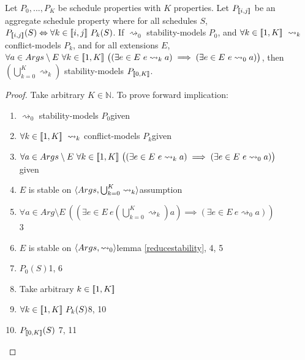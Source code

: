 \begin{theorem}
	\label{modelling}
	Let $P_0,...,P_K$ be schedule properties with $K$ properties. Let $P_{[\![{i,j}]\!]}$ be an aggregate schedule property where for all schedules $S$, $P_{[\![{i, j}]\!]}(S)\Leftrightarrow\forall k\in[\![{i,j}]\!]\ P_k(S)$.
	\linespace
	If $\rightsquigarrow_0$ stability-models $P_0$, and $\forall k\in\intset{1,K}\ \rightsquigarrow_k$ conflict-models $P_k$, and for all extensions $E$, $\forall a\in Args\setminus E\ \forall k\in[\![{1,K}]\!]\ \big((\exists e\in E\ e\rightsquigarrow_k a)\implies(\exists e\in E\ e\rightsquigarrow_0 a)\big)$, then $\left(\bigcup_{k=0}^K\rightsquigarrow_k\right)$ stability-models $P_{[\![{0,K}]\!]}$.
	
	\begin{proof}
		Take arbitrary $K\in\mathbb{N}$. To prove forward implication:
		\begin{enumerate}
			\item$\rightsquigarrow_0$ stability-models $P_0$\hfill given
			\item$\forall k\in\intset{1,K}\ \rightsquigarrow_k$ conflict-models $P_k$\hfill given
			\item$\forall a\in Args\setminus E\ \forall k\in[\![{1,K}]\!]\ \big((\exists e\in E\ e\rightsquigarrow_k a)\implies(\exists e\in E\ e\rightsquigarrow_0 a)\big)$\\\null\hfill given
			\item$E$ is stable on $\langle{Args},{\bigcup_{k=0}^K\rightsquigarrow_k}\rangle$\hfill assumption
			\item$\forall a\in Arg\setminus E\ \left(\left(\exists e\in E\ e\left(\bigcup_{k=0}^K\rightsquigarrow_k\right) a\right)\implies(\exists e\in E\ e\rightsquigarrow_0 a)\right)$\\\null\hfill 3
			\item$E$ is stable on $\langle{Args},{\rightsquigarrow_0}\rangle$\hfill lemma \ref{reducestability}, 4, 5
			\item$P_0(S)$\hfill 1, 6
			\item Take arbitrary $k\in[\![{1,K}]\!]$
			\item$\forall k\in\intset{1,K}\ P_k(S)$\hfill 8, 10
			\item$P_{[\![{0,K}]\!]}(S)$ \hfill 7, 11
		\end{enumerate}
	

\end{proof}
\end{theorem}
